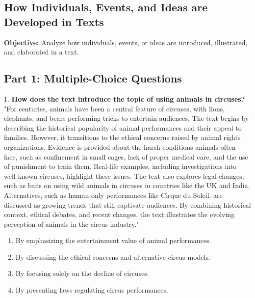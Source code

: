 \documentclass[12pt]{article}
\begin{document}
\subsection*{How Individuals, Events, and Ideas are Developed in Texts}
\onehalfspacing

\begin{tcolorbox}[colframe=black!40, colback=gray!0, title=Learning Objective]
\textbf{Objective:} Analyze how individuals, events, or ideas are introduced, illustrated, and elaborated in a text.
\end{tcolorbox}

\subsection*{Part 1: Multiple-Choice Questions}

1. \textbf{How does the text introduce the topic of using animals in circuses?\\}
"For centuries, animals have been a central feature of circuses, with lions, elephants, and bears performing tricks to entertain audiences. The text begins by describing the historical popularity of animal performances and their appeal to families. However, it transitions to the ethical concerns raised by animal rights organizations. Evidence is provided about the harsh conditions animals often face, such as confinement in small cages, lack of proper medical care, and the use of punishment to train them. Real-life examples, including investigations into well-known circuses, highlight these issues. The text also explores legal changes, such as bans on using wild animals in circuses in countries like the UK and India. Alternatives, such as human-only performances like Cirque du Soleil, are discussed as growing trends that still captivate audiences. By combining historical context, ethical debates, and recent changes, the text illustrates the evolving perception of animals in the circus industry."  
\begin{enumerate}[label=\Alph*.]
    \item By emphasizing the entertainment value of animal performances.  
    \item By discussing the ethical concerns and alternative circus models.  
    \item By focusing solely on the decline of circuses.  
    \item By presenting laws regulating circus performances.  
\end{enumerate}
\end{document}
